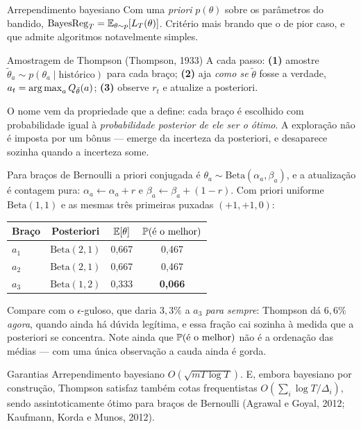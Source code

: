 \documentclass[11pt, a4paper]{article}
\newcommand{\gap}{\Delta}
\newcommand{\Reg}{L}
\newcommand{\Bet}{\mathrm{Beta}}
\begin{document}
\begin{defbox}{Arrependimento bayesiano}
Com uma \emph{priori} $p(\theta)$ sobre os parâmetros do bandido,
$\mathrm{BayesReg}_T = \E_{\theta\sim p}[\Reg_T(\theta)]$. Critério mais
brando que o de pior caso, e que admite algoritmos notavelmente simples.
\end{defbox}

\begin{algbox}{Amostragem de Thompson (Thompson, 1933)}
A cada passo: \textbf{(1)} amostre $\tilde\theta_a \sim p(\theta_a \mid
\text{histórico})$ para cada braço; \textbf{(2)} aja \emph{como se}
$\tilde\theta$ fosse a verdade, $a_t = \operatorname*{arg\,max}_a Q_{\tilde\theta}(a)$;
\textbf{(3)} observe $r_t$ e atualize a posteriori.
\end{algbox}

O nome vem da propriedade que a define: cada braço é escolhido com
probabilidade igual à \emph{probabilidade posterior de ele ser o ótimo}. A
exploração não é imposta por um bônus — emerge da incerteza da posteriori, e
desaparece sozinha quando a incerteza some.

Para braços de Bernoulli a priori conjugada é
$\theta_a \sim \Bet(\alpha_a, \beta_a)$, e a atualização é contagem pura:
$\alpha_a \leftarrow \alpha_a + r$ e $\beta_a \leftarrow \beta_a + (1-r)$.
Com priori uniforme $\Bet(1,1)$ e as mesmas três primeiras puxadas
$(+1,+1,0)$:

\begin{center}
\begin{tabular}{lccc}
\toprule
\textbf{Braço} & \textbf{Posteriori} & $\mathbb{E}[\theta]$
  & $\mathbb{P}(\text{é o melhor})$ \\
\midrule
$a_1$ & $\Bet(2,1)$ & 0,667 & 0,467 \\
$a_2$ & $\Bet(2,1)$ & 0,667 & 0,467 \\
$a_3$ & $\Bet(1,2)$ & 0,333 & \textbf{0,066} \\
\bottomrule
\end{tabular}
\end{center}

Compare com o $\epsilon$-guloso, que daria $3{,}3\%$ a $a_3$ \emph{para
sempre}: Thompson dá $6{,}6\%$ \emph{agora}, quando ainda há dúvida legítima,
e essa fração cai sozinha à medida que a posteriori se concentra. Note ainda
que $\mathbb{P}(\text{é o melhor})$ não é a ordenação das médias — com uma única
observação a cauda ainda é gorda.

\begin{teobox}{Garantias}
Arrependimento bayesiano $O(\sqrt{mT\log T})$. E, embora bayesiano por
construção, Thompson satisfaz também cotas frequentistas
$O(\sum_i \log T/\gap_i)$, sendo assintoticamente ótimo para braços de
Bernoulli (Agrawal e Goyal, 2012; Kaufmann, Korda e Munos, 2012).
\end{teobox}
\end{document}
